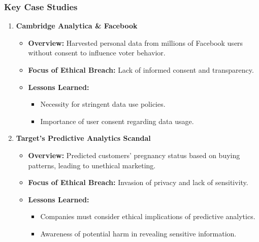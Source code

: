 \documentclass{beamer}
\begin{document}
\begin{frame}[fragile]
    \frametitle{Key Case Studies}
    \begin{enumerate}
        \item \textbf{Cambridge Analytica \& Facebook}
            \begin{itemize}
                \item \textbf{Overview:} Harvested personal data from millions of Facebook users without consent to influence voter behavior.
                \item \textbf{Focus of Ethical Breach:} Lack of informed consent and transparency.
                \item \textbf{Lessons Learned:}
                    \begin{itemize}
                        \item Necessity for stringent data use policies.
                        \item Importance of user consent regarding data usage.
                    \end{itemize}
            \end{itemize}
            
        \item \textbf{Target's Predictive Analytics Scandal}
            \begin{itemize}
                \item \textbf{Overview:} Predicted customers' pregnancy status based on buying patterns, leading to unethical marketing.
                \item \textbf{Focus of Ethical Breach:} Invasion of privacy and lack of sensitivity.
                \item \textbf{Lessons Learned:}
                    \begin{itemize}
                        \item Companies must consider ethical implications of predictive analytics.
                        \item Awareness of potential harm in revealing sensitive information.
                    \end{itemize}
            \end{itemize}
            

\end{enumerate}
\end{frame}
\end{document}

